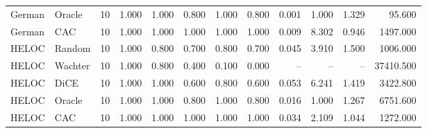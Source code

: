 \begin{table}[t]
\begin{tabular}{llrrrrrrrrrr}
German & Oracle & 10 & 1.000 & 1.000 & 0.800 & 1.000 & 0.800 & 0.001 & 1.000 & 1.329 & 95.600 \\
German & CAC & 10 & 1.000 & 1.000 & 1.000 & 1.000 & 1.000 & 0.009 & 8.302 & 0.946 & 1497.000 \\
HELOC & Random & 10 & 1.000 & 0.800 & 0.700 & 0.800 & 0.700 & 0.045 & 3.910 & 1.500 & 1006.000 \\
HELOC & Wachter & 10 & 1.000 & 0.800 & 0.400 & 0.100 & 0.000 & -- & -- & -- & 37410.500 \\
HELOC & DiCE & 10 & 1.000 & 1.000 & 0.600 & 0.800 & 0.600 & 0.053 & 6.241 & 1.419 & 3422.800 \\
HELOC & Oracle & 10 & 1.000 & 1.000 & 0.800 & 1.000 & 0.800 & 0.016 & 1.000 & 1.267 & 6751.600 \\
HELOC & CAC & 10 & 1.000 & 1.000 & 1.000 & 1.000 & 1.000 & 0.034 & 2.109 & 1.044 & 1272.000 \\
\bottomrule
\end{tabular}
\end{table}
